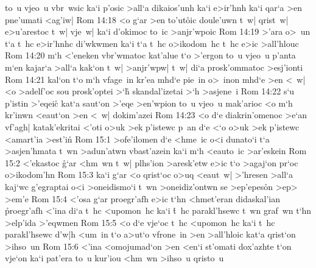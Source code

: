to~u
vjeo~u
vbr~wsic
ka`i
p'osic
>all`a
dikaios'unh
ka`i
e>ir'hnh
ka`i
qar`a
>en
pne'umati
<ag'iw|\bibvsend
\vs Rom 14:18
<o
g`ar
>en
to'ut\r{o}ic
doule'uwn
t~w|
qrist~w|
e>u'arestoc
t~w|
vje~w|
ka`i
d'okimoc
to~ic
>anjr'wpoic\bibvsend
\vs Rom 14:19
>'ara
o>~un
t`a
t~hc
e>ir'hnhc
di'wkwmen
ka`i
t`a
t~hc
o>ikodom~hc
t~hc
e>ic
>all'hlouc\bibvsend
\vs Rom 14:20
m`h
<'eneken
vbr'wmatoc
kat'alue
t`o
>'ergon
to~u
vjeo~u
p'anta
m`en
kajar`a
>all`a
kak`on
t~w|
>anjr'wpw|
t~w|
di`a
prosk'ommatoc
>esj'ionti\bibvsend
\vs Rom 14:21
kal`on
t`o
m`h
vfage~in
kr'ea
mhd`e
pie~in
o>~inon
mhd`e
>en
<~w|
<o
>adelf'oc
sou
prosk'optei
>`h\r{}
skandal'izetai
>`h
>asjene~i\bibvsend
\vs Rom 14:22
s`u
p'istin
>'eqeic\r{}
kat`a
saut`on
>'eqe
>en'wpion
to~u
vjeo~u
mak'arioc
<o
m`h
kr'inwn
<eaut`on
>en
<~w|
dokim'azei\bibvsend
\vs Rom 14:23
<o
d`e
diakrin'omenoc
>e`an
vf'agh|
katak'ekritai
<'oti
o>uk
>ek
p'istewc
p~an
d`e
<`o
o>uk
>ek
p'istewc
<amart'ia
>est'i\r{n}\bibvsend
{}
\vs Rom 15:1
>ofe'ilomen
d`e
<hme~ic
o<i
dunato`i
t`a
>asjen'hmata
t~wn
>adun'atwn
vbast'azein
ka`i
m`h
<eauto~ic
>ar'eskein\bibvsend
\vs Rom 15:2
<'ekastoc
\r{g}`ar
<hm~wn
t~w|
plhs'ion
>aresk'etw
e>ic
t`o
>agaj`on
pr`oc
o>ikodom'hn\bibvsend
\vs Rom 15:3
ka`i
g`ar
<o
qrist`oc
o>uq
<eaut~w|
>'hresen
>all`a
kaj`wc
g'egraptai
o<i
>oneidismo`i
t~wn
>oneidiz'ontwn
se
>ep'epes\r{o}n
>ep>
>em'e\bibvsend
\vs Rom 15:4
<'osa
g`ar
proegr'afh
e>ic
t`hn
<hmet'eran
didaskal'ian
\r{p}roegr'afh
<'ina
di`a
t~hc
<upomon~hc
ka`i
\r{t}~hc
parakl'hsewc
t~wn
graf~wn
t`hn
>elp'ida
>'eqwmen\bibvsend
\vs Rom 15:5
<o
d`e
vje`oc
t~hc
<upomon~hc
ka`i
t~hc
parakl'hsewc
d'w|h
<um~in
t`o
a>ut`o
vfrone~in
>en
>all'hloic
kat`a
qrist`on
>ihso~un\bibvsend
\vs Rom 15:6
<'ina
<omojumad`on
>en
<en`i
st'omati
dox'azhte
t`on
vje`on
ka`i
pat'era
to~u
kur'iou
<hm~wn
>ihso~u
qristo~u\bibvsend

